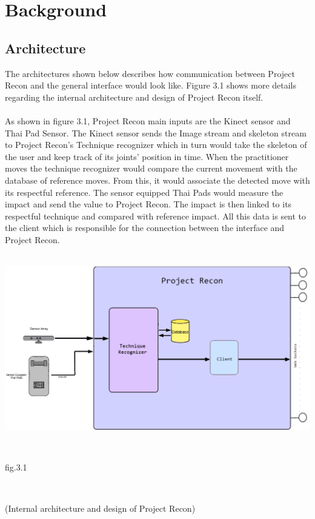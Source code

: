 \chapter{Background}\label{chap:background}
\section{Architecture}
The architectures shown below describes how communication between Project Recon and the general interface would look like. Figure 3.1 shows more details regarding the internal architecture and design of Project Recon itself.
\\
\\
As shown in figure 3.1, Project Recon main inputs are the Kinect sensor and Thai Pad Sensor. The Kinect sensor sends the Image stream and skeleton stream to Project Recon's Technique recognizer which in turn would take the skeleton of the user and keep track of its joints' position in time. When the practitioner moves the technique recognizer would compare the current movement with the database of reference moves. From this, it would associate the detected move with its respectful reference. The sensor equipped Thai Pads would measure the impact and send the value to Project Recon. The impact is then linked to its respectful technique and compared with reference impact. All this data is sent to the client which is responsible for the connection between the interface and Project Recon.
\\
\\
\centerline{\includegraphics[scale=0.4]{project_Recon_diagram.png}}
\\
\centerline{fig.3.1}
\\
\centerline{(Internal architecture and design of Project Recon)}
\\
\\
\\
